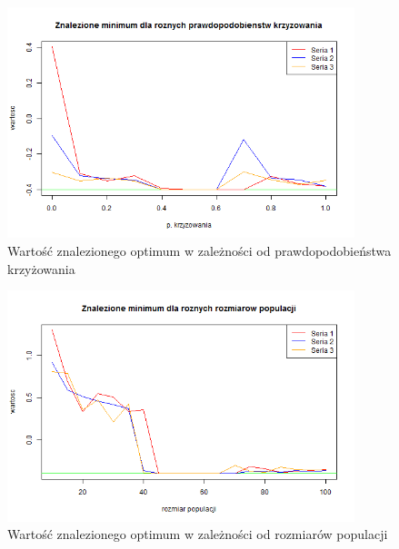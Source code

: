 \documentclass[11pt, a4paper]{article}
\begin{document}
\begin{figure}[H]
	\begin{center}
		\includegraphics[width=0.9\textwidth]{./assets/CosMix43.png} %
		\caption{Wartość znalezionego optimum w zależności od prawdopodobieństwa krzyżowania}
		\label{fig:cosmix43}
	\end{center}
\end{figure}

\begin{figure}[H]
	\begin{center}
		\includegraphics[width=0.9\textwidth]{./assets/CosMix44.png} %
		\caption{Wartość znalezionego optimum w zależności od rozmiarów populacji}
		\label{fig:cosmix44}
	\end{center}
\end{figure}
\end{document}

